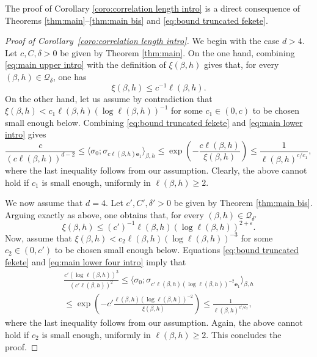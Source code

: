 \documentclass[10pt,a4paper]{amsart}
\numberwithin{equation}{section}
\begin{document}
	The proof of Corollary \ref{coro:correlation length intro} is a direct consequence of Theorems \ref{thm:main}--\ref{thm:main bis} and \eqref{eq:bound truncated fekete}.
\begin{proof}[Proof of Corollary~\textup{\ref{coro:correlation length intro}}] We begin with the case $d>4$. Let $c,C,\delta>0$ be given by Theorem \ref{thm:main}. On the one hand, combining \eqref{eq:main upper intro} with the definition of $\xi(\beta,h)$ gives that, for every $(\beta,h)\in \mathcal Q_\delta$, one has 
\begin{equation}
\xi(\beta,h)\leq c^{-1}\ell(\beta,h).
\end{equation}
On the other hand, let us assume by contradiction that $\xi(\beta,h)< c_1\ell(\beta,h)(\log \ell(\beta,h))^{-1}$ for some $c_1\in (0,c)$ to be chosen small enough below. Combining \eqref{eq:bound truncated fekete} and \eqref{eq:main lower intro} gives
\begin{equation}
	\frac{c}{(c\ell(\beta,h))^{d-2}}\leq \langle \sigma_0;\sigma_{c\ell(\beta,h)\mathbf{e}_1}\rangle_{\beta,h}\leq \exp\left(-\frac{c\ell(\beta,h)}{\xi(\beta,h)}\right)\leq \frac{1}{\ell(\beta,h)^{c/c_1}},
\end{equation}
where the last inequality follows from our assumption. Clearly, the above cannot hold if $c_1$ is small enough, uniformly in $\ell(\beta,h)\geq 2$. 

We now assume that $d=4$. Let $c',C',\delta'>0$ be given by Theorem \ref{thm:main bis}. Arguing exactly as above, one obtains that, for every $(\beta,h)\in \mathcal Q_{\delta'}$
\begin{equation}
	\xi(\beta,h)\leq (c')^{-1}\ell(\beta,h)(\log \ell(\beta,h))^{2+\varepsilon}.
\end{equation}
Now, assume that $\xi(\beta,h)<c_2 \ell(\beta,h)(\log \ell(\beta,h))^{-3}$ for some $c_2\in (0,c')$ to be chosen small enough below. Equations
 \eqref{eq:bound truncated fekete} and \eqref{eq:main lower four intro} imply that
\begin{multline}
	\frac{c'(\log \ell(\beta,h))^3}{(c'\ell(\beta,h))^2}\leq \langle \sigma_0;\sigma_{c'\ell(\beta,h)(\log \ell(\beta,h))^{-2}\mathbf{e}_1}\rangle_{\beta,h}\\\leq \exp\left(-c'\frac{\ell(\beta,h)(\log \ell(\beta,h))^{-2}}{\xi(\beta,h)}\right)\leq \frac{1}{\ell(\beta,h)^{c'/c_2}},
\end{multline}
where the last inequality follows from our assumption. Again, the above cannot hold if $c_2$ is small enough, uniformly in $\ell(\beta,h)\geq 2$. This concludes the proof.
\end{proof}
\end{document}

